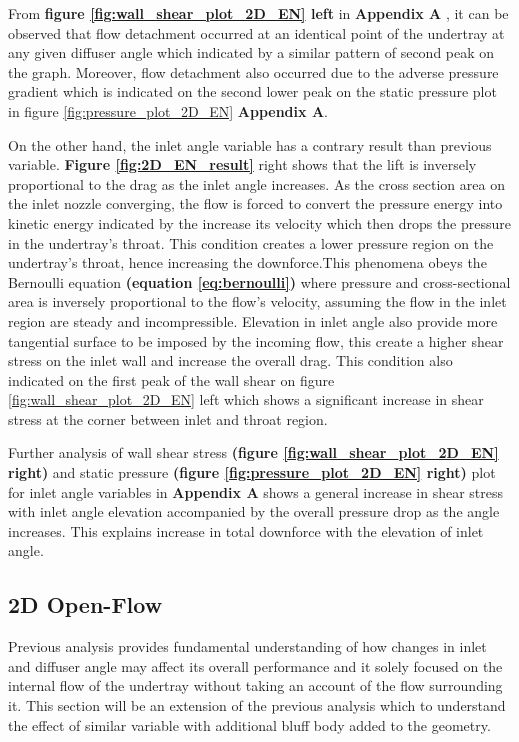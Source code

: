 \noindent From \textbf{figure \ref{fig:wall_shear_plot_2D_EN} left} in \textbf{Appendix A} ,  it can be observed that flow detachment occurred at an identical point of the undertray at any given diffuser angle which indicated by a similar pattern of second peak on the graph. Moreover,  flow detachment also occurred due to the adverse pressure gradient which is indicated on the second lower peak on the static pressure plot in figure \ref{fig:pressure_plot_2D_EN} \textbf{Appendix A}.

\noindent On the other hand, the inlet angle variable has a contrary result than previous variable. \textbf{Figure \ref{fig:2D_EN_result}} right shows that the lift  is inversely proportional to the drag as the inlet angle increases.  As the cross section area on the inlet nozzle converging, the flow is forced to convert the pressure energy into kinetic energy indicated by the increase its velocity which then drops the pressure in the undertray's throat. This condition creates a lower pressure region on the undertray's throat, hence increasing the downforce.This phenomena obeys the Bernoulli equation \textbf{ (equation \ref{eq:bernoulli})} where pressure and cross-sectional area is inversely proportional to the flow's velocity, assuming the flow in the inlet region are steady and incompressible.  Elevation in inlet angle also provide more tangential surface to be imposed by the incoming flow, this create a higher shear stress on the inlet wall and increase the overall drag. This condition also indicated on the first peak of the wall shear on figure \ref{fig:wall_shear_plot_2D_EN} left which shows a significant increase in shear stress at the corner between inlet and throat region.

\noindent Further analysis of wall shear stress \textbf{(figure \ref{fig:wall_shear_plot_2D_EN} right)} and static pressure \textbf{(figure \ref{fig:pressure_plot_2D_EN} right)} plot for inlet angle variables in \textbf{Appendix A} shows a general increase in shear stress with inlet angle elevation accompanied by the overall pressure drop as the angle increases. This explains increase in total downforce with the elevation of inlet angle.



\subsection{2D Open-Flow}
Previous analysis provides fundamental understanding of how changes in inlet and diffuser angle may affect its overall performance and it solely focused on the internal flow of the undertray without taking an account of the flow surrounding it. This section will be an extension of the previous analysis which to understand the effect of similar variable with additional bluff body added to the geometry. 


